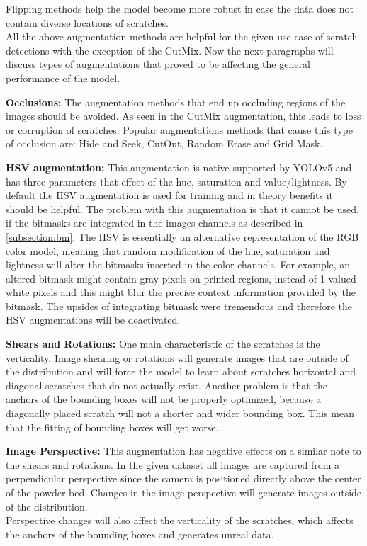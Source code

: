 Flipping methods help the model become more robust in case the data does not contain diverse locations of scratches. \\


All the above augmentation methods are helpful for the given use case of scratch detections with the exception of the CutMix. Now the next paragraphs will discuss types of augmentations that proved to be affecting the general performance of the model.

\textbf{Occlusions:} The augmentation methods that end up occluding regions of the images should be avoided. As seen in the CutMix augmentation, this leads to loss or corruption of scratches. Popular augmentations methods that cause this type of occlusion are: Hide and Seek, CutOut, Random Erase and Grid Mask.

\textbf{HSV augmentation:} This augmentation is native supported by YOLOv5 and has three parameters that effect of the hue, saturation and value/lightness. By default the HSV augmentation is used for training and in theory benefits it should be helpful. The problem with this augmentation is that it cannot be used, if the bitmasks are integrated in the images channels as described in \ref{subsection:bm}. The HSV is essentially an alternative representation of the RGB color model, meaning that random modification of the hue, saturation and lightness will alter the bitmasks inserted in the color channels. For example, an altered bitmask might contain gray pixels on printed regions, instead of 1-valued white pixels and this might blur the precise context information provided by the bitmask. The upsides of integrating bitmask were tremendous and therefore the HSV augmentations will be deactivated.

\textbf{Shears and Rotations:} One main characteristic of the scratches is the verticality. Image shearing or rotations will generate images that are outside of the distribution and will force the model to learn about scratches horizontal and diagonal scratches that do not actually exist. Another problem is that the anchors of the bounding boxes will not be properly optimized, because a diagonally placed scratch will not a shorter and wider bounding box. This mean that the fitting of bounding boxes will get worse.

\textbf{Image Perspective:} This augmentation has negative effects on a similar note to the shears and rotations. In the given dataset all images are captured from a perpendicular perspective since the camera is positioned directly above the center of the powder bed. Changes in the image perspective will generate images outside of the distribution. \\
Perspective changes will also affect the verticality of the scratches, which affects the anchors of the bounding boxes and generates unreal data. \\

